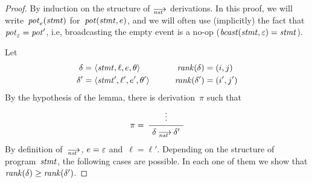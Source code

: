 
\lemxranknst*
\begin{proof}
  By induction on the structure of $\nst$ derivations.  In this proof, we
  will write~$\operatorname{\mathit{pot}}_e(\mathit{stmt})$ for~$\operatorname{\mathit{pot}}(\mathit{stmt},e)$, and we will often use
  (implicitly) the fact that~$\operatorname{\mathit{pot}}_\varepsilon=\operatorname{\mathit{pot}}'$, i.e, broadcasting the empty
  event is a no-op ($\mathop{\mathit{bcast}}(\mathit{stmt},\varepsilon)=\mathit{stmt}$).

  Let
  \begin{alignat*}{2}
    \delta&=\<\stmt,\ell,e,\theta>      &\qquad\rank(\delta)&=(i,j)\\
    \delta'&=\<\stmt',\ell',e',\theta'> &\qquad\rank(\delta')&=(i',j')
  \end{alignat*}
  By the hypothesis of the lemma, there is derivation~$\pi$ such that
  \[
    \AxiomC{\strut$\vdots$}
    \LeftLabel{\strut$\pi=\null$}
    \UnaryInfC{\strut$\delta\nst\delta'$}
    \DisplayProof
  \]
  By definition of~$\nst$, $e=\varepsilon$ and~$\ell=\ell'$.  Depending on the
  structure of program~$\mathit{stmt}$, the following cases are possible.  In each
  one of them we show that $\operatorname{\mathit{rank}}(\delta)\ge\operatorname{\mathit{rank}}(\delta')$.


\end{proof}
